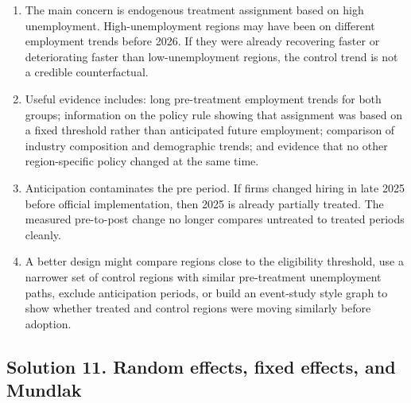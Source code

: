 \documentclass[11pt]{article}
\begin{document}
\begin{solutionbox}
\begin{enumerate}[label=(\alph*)]
\item The main concern is endogenous treatment assignment based on high unemployment. High-unemployment regions may have been on different employment trends before 2026. If they were already recovering faster or deteriorating faster than low-unemployment regions, the control trend is not a credible counterfactual.

\item Useful evidence includes: long pre-treatment employment trends for both groups; information on the policy rule showing that assignment was based on a fixed threshold rather than anticipated future employment; comparison of industry composition and demographic trends; and evidence that no other region-specific policy changed at the same time.

\item Anticipation contaminates the pre period. If firms changed hiring in late 2025 before official implementation, then 2025 is already partially treated. The measured pre-to-post change no longer compares untreated to treated periods cleanly.

\item A better design might compare regions close to the eligibility threshold, use a narrower set of control regions with similar pre-treatment unemployment paths, exclude anticipation periods, or build an event-study style graph to show whether treated and control regions were moving similarly before adoption.
\end{enumerate}
\end{solutionbox}

\subsection*{Solution 11. Random effects, fixed effects, and Mundlak}
\end{document}

